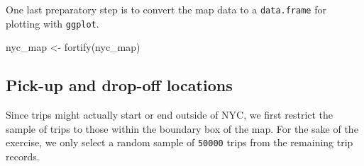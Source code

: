 \documentclass[
  12pt,
]{style/krantz}
\newenvironment{Shaded}{\begin{snugshade}}{\end{snugshade}}
\newcommand{\CommentTok}[1]{\textcolor[rgb]{0.56,0.35,0.01}{\textit{#1}}}
\newcommand{\DecValTok}[1]{\textcolor[rgb]{0.00,0.00,0.81}{#1}}
\newcommand{\FunctionTok}[1]{\textcolor[rgb]{0.00,0.00,0.00}{#1}}
\newcommand{\NormalTok}[1]{#1}
\newcommand{\OtherTok}[1]{\textcolor[rgb]{0.56,0.35,0.01}{#1}}
\newcommand{\SpecialCharTok}[1]{\textcolor[rgb]{0.00,0.00,0.00}{#1}}
\begin{document}
One last preparatory step is to convert the map data to a \texttt{data.frame} for plotting with \texttt{ggplot}.

\begin{Shaded}
\begin{Highlighting}[]
\NormalTok{nyc\_map }\OtherTok{\textless{}{-}} \FunctionTok{fortify}\NormalTok{(nyc\_map)}
\end{Highlighting}
\end{Shaded}

\hypertarget{pick-up-and-drop-off-locations}{%
\subsection{Pick-up and drop-off locations}\label{pick-up-and-drop-off-locations}}

Since trips might actually start or end outside of NYC, we first restrict the sample of trips to those within the boundary box of the map. For the sake of the exercise, we only select a random sample of \texttt{50000} trips from the remaining trip records.

\begin{Shaded}
\end{Shaded}
\end{document}
